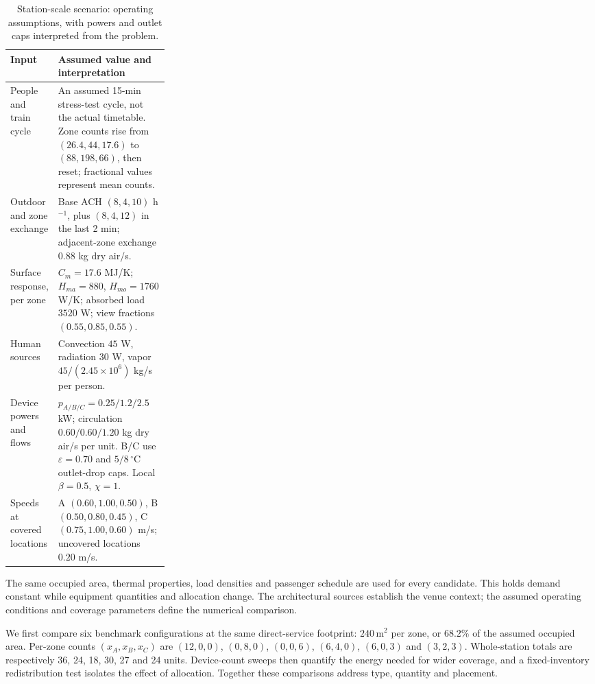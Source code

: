 \begin{table}[!ht]
\centering\small
\caption{Station-scale scenario: operating assumptions, with powers and outlet caps interpreted from the problem.}
\label{tab:rail-inputs}
\begin{tabularx}{\linewidth}{@{}>{\raggedright\arraybackslash}p{0.27\linewidth}>{\raggedright\arraybackslash}X@{}}
\toprule
Input & Assumed value and interpretation\\
\midrule
People and train cycle & An assumed 15-min stress-test cycle, not the actual timetable. Zone counts rise from $(26.4,44,17.6)$ to $(88,198,66)$, then reset; fractional values represent mean counts.\\
Outdoor and zone exchange & Base ACH $(8,4,10)$ h$^{-1}$, plus $(8,4,12)$ in the last 2 min; adjacent-zone exchange $0.88$ kg dry air/s.\\
Surface response, per zone & $C_m=17.6$ MJ/K; $H_{ma}=880$, $H_{mo}=1760$ W/K; absorbed load $3520$ W; view fractions $(0.55,0.85,0.55)$.\\
Human sources & Convection $45$ W, radiation $30$ W, vapor $45/(2.45\times10^6)$ kg/s per person.\\
Device powers and flows & $p_{A/B/C}=0.25/1.2/2.5$ kW; circulation $0.60/0.60/1.20$ kg dry air/s per unit. B/C use $\varepsilon=0.70$ and $5/8\,^{\circ}\mathrm C$ outlet-drop caps. Local $\beta=0.5$, $\chi=1$.\\
Speeds at covered locations & A $(0.60,1.00,0.50)$, B $(0.50,0.80,0.45)$, C $(0.75,1.00,0.60)$ m/s; uncovered locations $0.20$ m/s.\\
\bottomrule
\end{tabularx}
\end{table}

The same occupied area, thermal properties, load densities and passenger schedule are used for every candidate. This holds demand constant while equipment quantities and allocation change. The architectural sources establish the venue context; the assumed operating conditions and coverage parameters define the numerical comparison.

We first compare six benchmark configurations at the same direct-service footprint: $240\,\mathrm{m^2}$ per zone, or $68.2\%$ of the assumed occupied area. Per-zone counts $(x_A,x_B,x_C)$ are $(12,0,0)$, $(0,8,0)$, $(0,0,6)$, $(6,4,0)$, $(6,0,3)$ and $(3,2,3)$. Whole-station totals are respectively 36, 24, 18, 30, 27 and 24 units. Device-count sweeps then quantify the energy needed for wider coverage, and a fixed-inventory redistribution test isolates the effect of allocation. Together these comparisons address type, quantity and placement.

